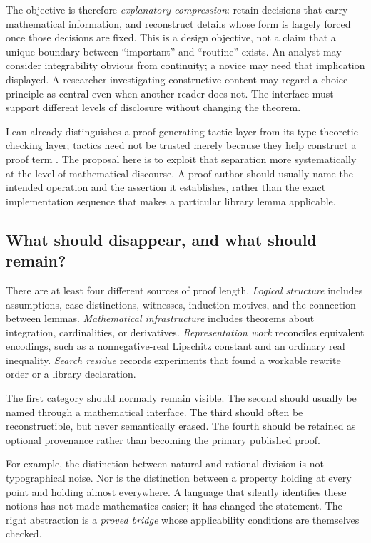 \documentclass[11pt,a4paper]{article}
\theoremstyle{definition}
\theoremstyle{remark}
\begin{document}
The objective is therefore \emph{explanatory compression}: retain decisions that carry mathematical information, and reconstruct details whose form is largely forced once those decisions are fixed. This is a design objective, not a claim that a unique boundary between ``important'' and ``routine'' exists. An analyst may consider integrability obvious from continuity; a novice may need that implication displayed. A researcher investigating constructive content may regard a choice principle as central even when another reader does not. The interface must support different levels of disclosure without changing the theorem.

Lean already distinguishes a proof-generating tactic layer from its type-theoretic checking layer; tactics need not be trusted merely because they help construct a proof term \cite{lean-tactics}. The proposal here is to exploit that separation more systematically at the level of mathematical discourse. A proof author should usually name the intended operation and the assertion it establishes, rather than the exact implementation sequence that makes a particular library lemma applicable.

\subsection{What should disappear, and what should remain?}
There are at least four different sources of proof length. \emph{Logical structure} includes assumptions, case distinctions, witnesses, induction motives, and the connection between lemmas. \emph{Mathematical infrastructure} includes theorems about integration, cardinalities, or derivatives. \emph{Representation work} reconciles equivalent encodings, such as a nonnegative-real Lipschitz constant and an ordinary real inequality. \emph{Search residue} records experiments that found a workable rewrite order or a library declaration.

The first category should normally remain visible. The second should usually be named through a mathematical interface. The third should often be reconstructible, but never semantically erased. The fourth should be retained as optional provenance rather than becoming the primary published proof.

For example, the distinction between natural and rational division is not typographical noise. Nor is the distinction between a property holding at every point and holding almost everywhere. A language that silently identifies these notions has not made mathematics easier; it has changed the statement. The right abstraction is a \emph{proved bridge} whose applicability conditions are themselves checked.
\end{document}
